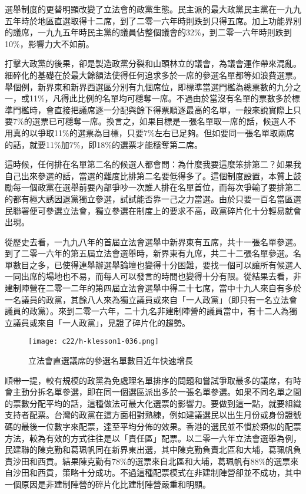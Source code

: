 選舉制度的更替明顯改變了立法會的政黨生態。民主派的最大政黨民主黨在一九九五年時於地區直選取得十二席，到了二零一六年時則跌到只得五席。加上功能界別的議席，一九九五年時民主黨的議員佔整個議會的32\%，到二零一六年時則跌到10\%，影響力大不如前。

打擊大政黨的後果，卻是製造政黨分裂和山頭林立的議會，為議會運作帶來混亂。細碎化的基礎在於最大餘額法使得任何追求多於一席的參選名單都等如浪費選票。舉個例，新界東和新界西選區分別有九個席位，即標準當選門檻為總票數的九分之一，或11\%，凡得此比例的名單均可穩奪一席。不過由於當沒有名單的票數多於標準門檻時，會直接把議席逐一分配與餘下得票順逐最高的名單，一般來說實際上只要7\%的選票已可穩奪一席。換言之，如果目標是一張名單取一席的話，候選人不用真的以爭取11\%的選票為目標，只要7\%左右已足夠。但如要同一張名單取兩席的話，就要11\%加7\%，即18\%的選票才能穩奪第二席。

這時候，任何排在名單第二名的候選人都會問：為什麼我要這麼笨排第二？如果我自己出來參選的話，當選的難度比排第二名要低得多了。這個制度設置，本質上鼓勵每一個政黨在選舉前要內部爭吵一次誰人排在名單首位，而每次爭輸了要排第二的都有極大誘因退黨獨立參選，試試能否靠一己之力當選。由於只要一百名當區選民聯署便可參選立法會，獨立參選在制度上的要求不高，政黨碎片化十分輕易就會出現。

從歷史去看，一九九八年的首屆立法會選舉中新界東有五席，共十一張名單參選。到了二零一六年的第五屆立法會選舉時，新界東有九席，共二十二張名單參選。名單數目之多，已使得連舉辦選舉論壇也變得十分困難，要找一個可以讓所有候選人一同出席的場地也不易，而每人可以發言的時間也變得十分有限。從結果去看，非建制陣營在二零一二年的第四屆立法會選舉中得二十七席，當中十九人來自有多於一名議員的政黨，其餘八人來為獨立議員或來自「一人政黨」（即只有一名立法會議員的政黨）。來到二零一六年，二十九名非建制陣營的議員當中，有十二人為獨立議員或來自「一人政黨」，見證了碎片化的趨勢。

\begin{figure}[htbp]
    \centering
    \texttt{[image: c22/h-klesson1-036.png]}
    \caption{立法會直選議席的參選名單數目近年快速增長} 
\end{figure}

順帶一提，較有規模的政黨為免處理名單排序的問題和嘗試爭取最多的議席，有時會主動分拆名單參選，即在同一個選區派出多於一張名單參選。如果不同名單之間的票數分配平均的話，這種做法可最大化選票的影響力。要做到這一點，就要組織支持者配票。台灣的政黨在這方面相對熟練，例如建議選民以出生月份或身份證號碼的最後一位數字來配票，達至平均分佈的效果。香港的選民並不慣於類似的配票方法，較為有效的方式往往是以「責任區」配票。以二零一六年立法會選舉為例，民建聯的陳克勤和葛珮帆同在新界東出選，其中陳克勤負責北區和大埔，葛珮帆負責沙田和西貢。結果陳克勤有78\%的選票來自北區和大埔，葛珮帆有88\%的選票來自沙田和西貢，策略十分成功。不過這種配票模式在非建制陣營卻並不成功，其中一個原因是非建制陣營的碎片化比建制陣營嚴重和明顯。

